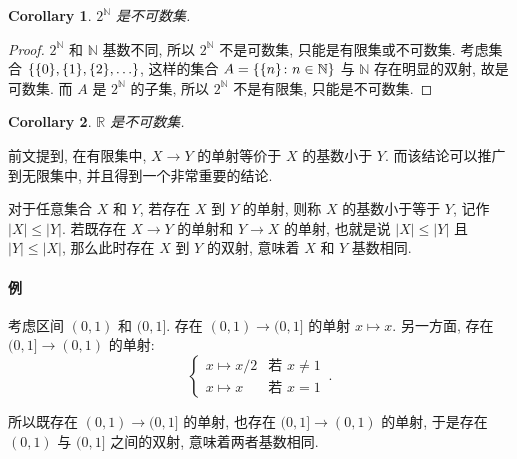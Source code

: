\documentclass[UTF8]{ctexart}
\theoremstyle{mystyle}
\theoremstyle{myremark}
\theoremstyle{plain}
\newtheorem{corollary}{Corollary}[section]
\newcommand{\R}{\mathbb R}
\newcommand{\N}{\mathbb N}
\DeclarePairedDelimiter\set{\{}{\}}
\begin{document}
\begin{corollary}
    $ 2^\N $ 是不可数集.
\end{corollary}

\begin{proof}
    $ 2^\N $ 和 $ \N $ 基数不同, 所以 $ 2^\N $ 不是可数集, 只能是有限集或不可数集. 考虑集合 $ \set{\set{0}, \set{1}, \set{2}, \dots} $, 这样的集合 $ A = \set{\set{n} \colon n \in \N} $ 与 $ \N $ 存在明显的双射, 故是可数集. 而 $ A $ 是 $ 2^\N $ 的子集, 所以 $ 2^\N $ 不是有限集, 只能是不可数集.
\end{proof}

\begin{corollary}
    $ \R $ 是不可数集.
\end{corollary}


前文提到, 在有限集中, $ X \to Y $ 的单射等价于 $ X $ 的基数小于 $ Y $. 而该结论可以推广到无限集中, 并且得到一个非常重要的结论.

\begin{theorem}
    对于任意集合 $ X $ 和 $ Y $, 若存在 $ X $ 到 $ Y $ 的单射, 则称 $ X $ 的基数小于等于 $ Y $, 记作 $ |X| \leqslant |Y| $. 若既存在 $ X \to Y $ 的单射和 $ Y \to X $ 的单射, 也就是说 $ |X| \leqslant |Y| $ 且 $ |Y| \leqslant |X| $, 那么此时存在 $ X $ 到 $ Y $ 的双射, 意味着 $ X $ 和 $ Y $ 基数相同.
\end{theorem}

\paragraph{例}
考虑区间 $ (0, 1) $ 和 $ (0, 1] $. 存在 $ (0, 1) \to (0, 1] $ 的单射 $ x \mapsto x $. 另一方面, 存在 $ (0, 1] \to (0, 1) $ 的单射:
\[ \begin{cases}
    x \mapsto x / 2 & \text{若 } x \neq 1 \\
    x \mapsto x & \text{若 } x = 1
\end{cases} \,.\]

所以既存在 $ (0, 1) \to (0, 1] $ 的单射, 也存在 $ (0, 1] \to (0, 1) $ 的单射, 于是存在 $ (0, 1) $ 与 $ (0, 1] $ 之间的双射, 意味着两者基数相同.
\end{document}
